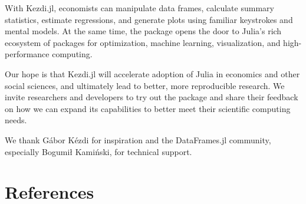 \documentclass{juliacon}
\begin{document}
With Kezdi.jl, economists can manipulate data frames, calculate summary statistics, estimate regressions, and generate plots using familiar keystrokes and mental models. At the same time, the package opens the door to Julia's rich ecosystem of packages for optimization, machine learning, visualization, and high-performance computing. 

Our hope is that Kezdi.jl will accelerate adoption of Julia in economics and other social sciences, and ultimately lead to better, more reproducible research. We invite researchers and developers to try out the package and share their feedback on how we can expand its capabilities to better meet their scientific computing needs.

\backmatter


We thank Gábor Kézdi for inspiration and the DataFrames.jl community, especially Bogumił Kamiński, for technical support.

\section*{References}
\begingroup
\setlength{\parindent}{0pt}
\setlength{\parskip}{2pt}  
\def\small{\small}




\endgroup
\end{document}
